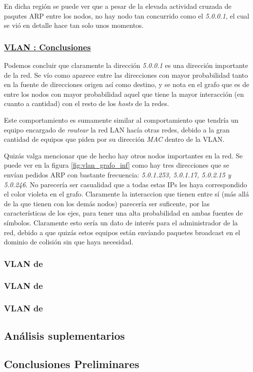     \par En dicha regi\'on se puede ver que a pesar de la elevada actividad cruzada de paqutes
    ARP entre los nodos, no hay nodo tan concurrido como el \textit{5.0.0.1}, el cual se
    vi\'o en detalle hace tan solo unos momentos.


    \subsubsection*{\underline{VLAN : Conclusiones}}\label{subsubsec:vlan10_conclusiones}
    \par Podemos concluir que claramente la direcci\'on \textit{5.0.0.1} es una
    direcci\'on importante de la red. Se v\'io como aparece entre las direcciones con mayor
    probabilidad tanto en la fuente de direcciones origen as\'i como destino, y se nota
    en el grafo que es de entre los nodos con mayor probabilidad aquel que tiene la mayor
    interacci\'on (en cuanto a cantidad) con el resto de los \textit{hosts} de la redes.

    \par Este comportamiento es sumamente similar al comportamiento que tendr\'ia un equipo
    encargado de \textit{routear} la red LAN hac\'ia otras redes, debido a la gran cantidad
    de equipos que piden por su direcci\'on \textit{MAC} dentro de la VLAN.

    \par Quiz\'as valga mencionar que de hecho hay otros nodos importantes en la red. Se
    puede ver en la figura \ref{fig:vlan_grafo_inf} como hay tres direcciones que se env\'ian
    pedidos ARP con bastante frecuencia: \textit{5.0.1.253, 5.0.1.17, 5.0.2.15 y 5.0.246}.
    No parecer\'ia ser casualidad que a todas estas IPs les haya correspondido el color
    violeta en el grafo. Claramente la interaccion que tienen entre s\'i (m\'as all\'a de la
    que tienen con los dem\'as nodos) parecer\'ia ser suficente, por las caracter\'isticas
    de los ejes, para tener una alta probabilidad en ambas fuentes de s\'imbolos. Claramente
    esto ser\'ia un dato de inter\'es para el administrador de la red, debido a que quiz\'as
    estos equipos est\'an env\'iando paquetes broadcast en el dominio de colisi\'on sin
    que haya necesidad.

    \subsubsection{VLAN de~}

    \subsubsection{VLAN de~}

    \subsubsection{VLAN de~}

    \subsection{An\'alisis suplementarios}

    \subsection{Conclusiones Preliminares}
